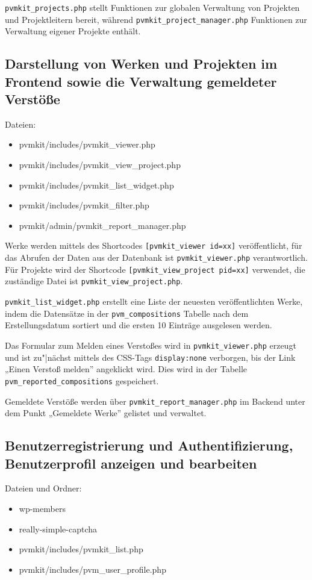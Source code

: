 \documentclass[a4paper,11pt]{article}
\begin{document}
\texttt{pvmkit\_projects.php} stellt Funktionen zur globalen Verwaltung von
Projekten und Projektleitern bereit, während
\texttt{pvmkit\_project\_manager.php} Funktionen zur Verwaltung eigener
Projekte enthält.
 
\subsection{Darstellung von Werken und Projekten im Frontend sowie die
  Verwaltung gemeldeter Verstöße}
 
Dateien:  
\begin{itemize}\itemsep0pt \tt 
\item pvmkit/includes/pvmkit\_viewer.php
\item pvmkit/includes/pvmkit\_view\_project.php
\item pvmkit/includes/pvmkit\_list\_widget.php
\item pvmkit/includes/pvmkit\_filter.php
\item pvmkit/admin/pvmkit\_report\_manager.php
\end{itemize}
Werke werden mittels des Shortcodes \texttt{[pvmkit\_viewer id=xx]}
veröffentlicht, für das Abrufen der Daten aus der Datenbank ist
\texttt{pvmkit\_viewer.php} verantwortlich. Für Projekte wird der Shortcode
\texttt{[pvmkit\_view\_project pid=xx]} verwendet, die zuständige Datei ist
\texttt{pvmkit\_view\_project.php}.
 
\texttt{pvmkit\_list\_widget.php} erstellt eine Liste der neuesten
veröffentlichten Werke, indem die Datensätze in der \texttt{pvm\_compositions}
Tabelle nach dem Erstellungsdatum sortiert und die ersten 10 Einträge
ausgelesen werden.
 
Das Formular zum Melden eines Verstoßes wird in \texttt{pvmkit\_viewer.php}
erzeugt und ist zu"|nächst mittels des CSS-Tags \texttt{display:none}
verborgen, bis der Link „Einen Verstoß melden” angeklickt wird.  Dies wird in
der Tabelle \texttt{pvm\_reported\_compositions} gespeichert.
 
Gemeldete Verstöße werden über \texttt{pvmkit\_report\_manager.php} im Backend
unter dem Punkt „Gemeldete Werke” gelistet und verwaltet.
 
\subsection{Benutzerregistrierung und Authentifizierung, Benutzerprofil
  anzeigen und bearbeiten}
 
Dateien und Ordner:  
\begin{itemize}\itemsep0pt\tt
\item wp-members
\item really-simple-captcha
\item pvmkit/includes/pvmkit\_list.php
\item pvmkit/includes/pvm\_user\_profile.php
\end{itemize}
 
\end{document}
